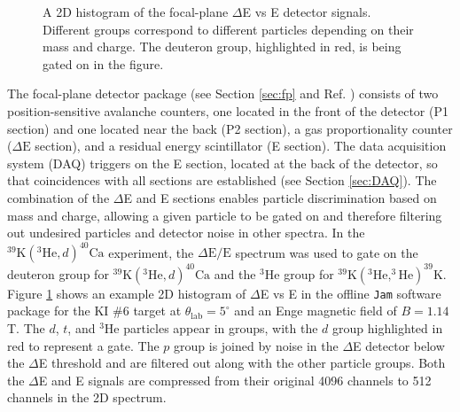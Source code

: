 \begin{figure}[t]
\caption{\label{fig:5deg_DEvsE}A 2D histogram of the focal-plane $\Delta$E vs E detector signals. Different groups correspond to different particles depending on their mass and charge. The deuteron group, highlighted in red, is being gated on in the figure.}
\end{figure}

The focal-plane detector package (see Section \ref{sec:fp} and Ref. \cite{Marshall2019}) consists of two position-sensitive avalanche counters, one located in the front of the detector (P1 section) and one located near the back (P2 section), a gas proportionality counter ($\Delta\mathrm{E}$ section), and a residual energy scintillator (E section). The data acquisition system (DAQ) triggers on the E section, located at the back of the detector, so that coincidences with all sections are established (see Section \ref{sec:DAQ}). The combination of the $\Delta$E and E sections enables particle discrimination based on mass and charge, allowing a given particle to be gated on and therefore filtering out undesired particles and detector noise in other spectra. In the $^{39}\mathrm{K}(^{3}\mathrm{He},d)^{40}\mathrm{Ca}$ experiment, the $\Delta\mathrm{E}/\mathrm{E}$ spectrum was used to gate on the deuteron group for $^{39}\mathrm{K}(^{3}\mathrm{He},d)^{40}\mathrm{Ca}$ and the $^{3}\mathrm{He}$ group for $^{39}\mathrm{K}(^{3}\mathrm{He},^{3}\mathrm{He})^{39}\mathrm{K}$. Figure \ref{fig:5deg_DEvsE} shows an example 2D histogram of $\Delta$E vs E in the offline \texttt{Jam} software package \cite{Swartz2001,Jam} for the KI $\#$6 target at $\theta_{\mathrm{lab}} = 5^{\circ}$ and an Enge magnetic field of $B = 1.14$ T. The $d$, $t$, and $^{3}$He particles appear in groups, with the $d$ group highlighted in red to represent a gate. The $p$ group is joined by noise in the $\Delta$E detector below the $\Delta$E threshold and are filtered out along with the other particle groups. Both the $\Delta$E and E signals are compressed from their original 4096 channels to 512 channels in the 2D spectrum. 

